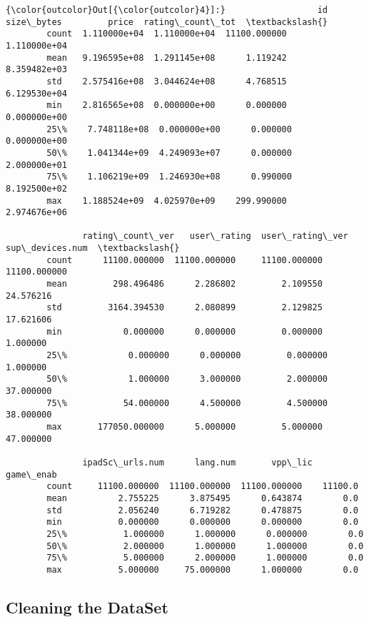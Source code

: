 \documentclass[11pt]{article}
\begin{document}
\begin{Verbatim}[commandchars=\\\{\}]
{\color{outcolor}Out[{\color{outcolor}4}]:}                  id    size\_bytes         price  rating\_count\_tot  \textbackslash{}
        count  1.110000e+04  1.110000e+04  11100.000000      1.110000e+04   
        mean   9.196595e+08  1.291145e+08      1.119242      8.359482e+03   
        std    2.575416e+08  3.044624e+08      4.768515      6.129530e+04   
        min    2.816565e+08  0.000000e+00      0.000000      0.000000e+00   
        25\%    7.748118e+08  0.000000e+00      0.000000      0.000000e+00   
        50\%    1.041344e+09  4.249093e+07      0.000000      2.000000e+01   
        75\%    1.106219e+09  1.246930e+08      0.990000      8.192500e+02   
        max    1.188524e+09  4.025970e+09    299.990000      2.974676e+06   
        
               rating\_count\_ver   user\_rating  user\_rating\_ver  sup\_devices.num  \textbackslash{}
        count      11100.000000  11100.000000     11100.000000     11100.000000   
        mean         298.496486      2.286802         2.109550        24.576216   
        std         3164.394530      2.080899         2.129825        17.621606   
        min            0.000000      0.000000         0.000000         1.000000   
        25\%            0.000000      0.000000         0.000000         1.000000   
        50\%            1.000000      3.000000         2.000000        37.000000   
        75\%           54.000000      4.500000         4.500000        38.000000   
        max       177050.000000      5.000000         5.000000        47.000000   
        
               ipadSc\_urls.num      lang.num       vpp\_lic  game\_enab  
        count     11100.000000  11100.000000  11100.000000    11100.0  
        mean          2.755225      3.875495      0.643874        0.0  
        std           2.056240      6.719282      0.478875        0.0  
        min           0.000000      0.000000      0.000000        0.0  
        25\%           1.000000      1.000000      0.000000        0.0  
        50\%           2.000000      1.000000      1.000000        0.0  
        75\%           5.000000      2.000000      1.000000        0.0  
        max           5.000000     75.000000      1.000000        0.0  
\end{Verbatim}
            
    \hypertarget{cleaning-the-dataset}{%
\subsection{Cleaning the DataSet}\label{cleaning-the-dataset}}
\end{document}
